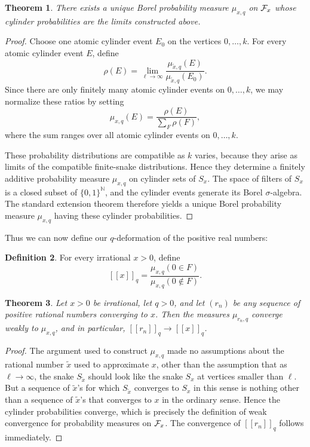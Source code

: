 \documentclass[12pt]{article}
\theoremstyle{plain}
\newtheorem{theorem}{Theorem}[section]
\theoremstyle{definition}
\newtheorem{definition}[theorem]{Definition}
\theoremstyle{remark}
\newcommand{\cF}{{\cal{F}}}
\newcommand{\llb}{[\![}
\newcommand{\rrb}{]\!]}
\begin{document}
\begin{theorem}
There exists a unique Borel probability measure $\mu_{x,q}$ on $\cF_x$ 
whose cylinder probabilities are the limits constructed above.
\end{theorem}

\begin{proof}
Choose one atomic cylinder event $E_0$ on the vertices
$0,\dots,k$.  For every atomic cylinder event $E$, define
\[ \rho(E) = \lim_{\ell\to\infty} 
\frac{\mu_{\tilde{x},q}(E)} {\mu_{\tilde{x},q}(E_0)}.  \]
Since there are only finitely many atomic cylinder events on
$0,\dots,k$, we may normalize these ratios by setting
\[ \mu_{x,q}(E) = \frac{\rho(E)} {\sum_F\rho(F)}, \]
where the sum ranges over all atomic cylinder events on
$0,\dots,k$.

These probability distributions are compatible as $k$ varies, because
they arise as limits of the compatible finite-snake distributions.
Hence they determine a finitely additive probability measure $\mu_{x,q}$ 
on cylinder sets of $S_x$.
The space of filters of $S_x$ is a closed subset of $\{0,1\}^{\mathbb N}$,
and the cylinder events generate its Borel $\sigma$-algebra.
The standard extension theorem therefore yields a unique Borel
probability measure $\mu_{x,q}$ having these cylinder probabilities.
\end{proof}

Thus we can now define our $q$-deformation of the positive real numbers:

\begin{definition}
For every irrational $x>0$, define 
\[ \llb x\rrb_q = \frac{\mu_{x,q}(0\in F)} {\mu_{x,q}(0\notin F)}. \]
\end{definition}

\begin{theorem}
Let $x>0$ be irrational, let $q>0$, and let $(r_n)$ be any sequence of
positive rational numbers converging to $x$.
Then the measures $\mu_{r_n,q}$ converge weakly to $\mu_{x,q}$,
and in particular, $\llb r_n \rrb_q \rightarrow \llb x \rrb_q$.
\label{thm:continuity}
\end{theorem}

\begin{proof}
The argument used to construct $\mu_{x,q}$
made no assumptions about the rational number $\widetilde{x}$
used to approximate $x$, other than the assumption that
as $\ell \rightarrow \infty$, the snake $S_{\widetilde{x}}$
should look like the snake $S_x$ at vertices smaller than $\ell$.
But a sequence of $\widetilde{x}$'s for which
$S_{\widetilde{x}}$ converges to $S_x$ in this sense
is nothing other than a sequence of $\widetilde{x}$'s
that converges to $x$ in the ordinary sense.
Hence the cylinder probabilities converge, 
which is precisely the definition of weak convergence 
for probability measures on $\cF_x$.
The convergence of $\llb r_n \rrb_q$ follows immediately.
\end{proof}
\end{document}
